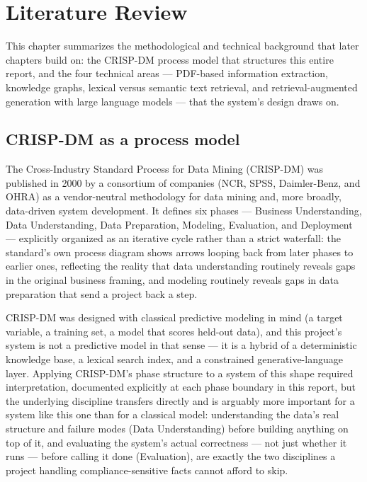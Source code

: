 \chapter{Literature Review}
\label{ch:literature-review}
This chapter summarizes the methodological and technical background that later chapters build on: the CRISP-DM process model that structures this entire report, and the four technical areas — PDF-based information extraction, knowledge graphs, lexical versus semantic text retrieval, and retrieval-augmented generation with large language models — that the system's design draws on.

\section{CRISP-DM as a process model}
The Cross-Industry Standard Process for Data Mining (CRISP-DM) was published in 2000 by a consortium of companies (NCR, SPSS, Daimler-Benz, and OHRA) as a vendor-neutral methodology for data mining and, more broadly, data-driven system development. It defines six phases — Business Understanding, Data Understanding, Data Preparation, Modeling, Evaluation, and Deployment — explicitly organized as an iterative cycle rather than a strict waterfall: the standard's own process diagram shows arrows looping back from later phases to earlier ones, reflecting the reality that data understanding routinely reveals gaps in the original business framing, and modeling routinely reveals gaps in data preparation that send a project back a step.

CRISP-DM was designed with classical predictive modeling in mind (a target variable, a training set, a model that scores held-out data), and this project's system is not a predictive model in that sense — it is a hybrid of a deterministic knowledge base, a lexical search index, and a constrained generative-language layer. Applying CRISP-DM's phase structure to a system of this shape required interpretation, documented explicitly at each phase boundary in this report, but the underlying discipline transfers directly and is arguably more important for a system like this one than for a classical model: understanding the data's real structure and failure modes (Data Understanding) before building anything on top of it, and evaluating the system's actual correctness — not just whether it runs — before calling it done (Evaluation), are exactly the two disciplines a project handling compliance-sensitive facts cannot afford to skip.

